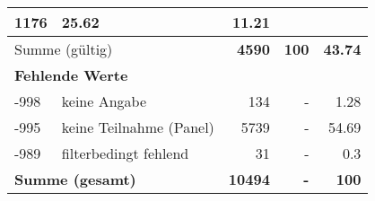 \begin{longtable}{lXrrr}
       \num{1176} &
       \num[round-mode=places,round-precision=2]{25.62} &
         \num[round-mode=places,round-precision=2]{11.21} \\
     \midrule
     \multicolumn{2}{l}{Summe (gültig)} &
       \textbf{\num{4590}} &
     \textbf{\num{100}} &
       \textbf{\num[round-mode=places,round-precision=2]{43.74}} \\
     \multicolumn{5}{l}{\textbf{Fehlende Werte}}\\
       -998 &
       keine Angabe &
         \num{134} &
        - &
         \num[round-mode=places,round-precision=2]{1.28} \\
       -995 &
       keine Teilnahme (Panel) &
         \num{5739} &
        - &
         \num[round-mode=places,round-precision=2]{54.69} \\
       -989 &
       filterbedingt fehlend &
         \num{31} &
        - &
         \num[round-mode=places,round-precision=2]{0.3} \\
     \midrule
     \multicolumn{2}{l}{\textbf{Summe (gesamt)}} &
          \textbf{\num{10494}} &
        \textbf{-} &
        \textbf{\num{100}} \\
     \bottomrule
     \end{longtable}
     
